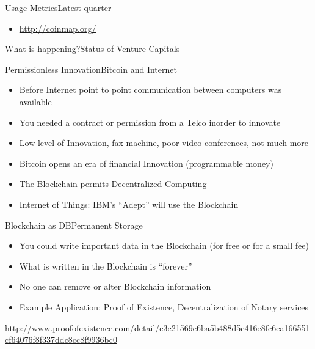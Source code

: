 \documentclass[english,compress]{beamer}
\begin{document}
\begin{frame}{Usage Metrics}{Latest quarter}
\begin{itemize}
 \item \url{http://coinmap.org/} 
\end{itemize}
\end{frame}

\begin{frame}{What is happening?}{Status of Venture Capitals}
\end{frame}

\begin{frame}{Permissionless Innovation}{Bitcoin and Internet}
\begin{itemize}
 \item Before Internet point to point communication between computers was available
 \item You needed a contract or permission from a Telco inorder to innovate
 \item Low level of Innovation, fax-machine, poor video conferences, not much more
 \item Bitcoin opens an era of financial Innovation (programmable money)
 \item The Blockchain permits Decentralized Computing
 \item Internet of Things: IBM's ``Adept'' will use the Blockchain 
\end{itemize}
\end{frame}

\begin{frame}{Blockchain as DB}{Permanent Storage}
\begin{itemize}
 \item You could write important data in the Blockchain (for free or for a small fee)
 \item What is written in the Blockchain is ``forever''
 \item No one can remove or alter Blockchain information
 \item Example Application: Proof of Existence, Decentralization of Notary services 
\end{itemize}
 
\begin{tiny}
 \url{http://www.proofofexistence.com/detail/e3c21569e6ba5b488d5c416e8fc6ea166551cf64076f8f337ddc8cc8f9936bc0}
\end{tiny}
\end{frame}
\end{document}
